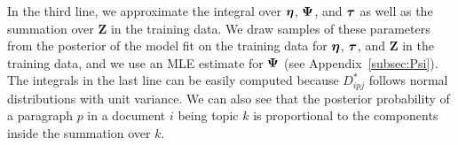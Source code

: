 In the third line, we approximate the integral over ${\boldsymbol \eta}$, ${\boldsymbol \Psi}$, and ${\boldsymbol \tau}$ as well as the summation over $\mathbf{Z}$ in the training data.
We draw samples of these parameters from the posterior of the model fit on the training data for ${\boldsymbol \eta}$, ${\boldsymbol \tau}$, and $\mathbf{Z}$ in the training data, and we use an MLE estimate for ${\boldsymbol \Psi}$ (see Appendix~\ref{subsec:Psi}). 
The integrals in the last line can be easily computed because $D_{ipj}^*$ follows normal distributions with unit variance. 
We can also see that the posterior probability of a paragraph $p$ in a document $i$ being topic $k$ is proportional to the components inside the summation over $k$.


